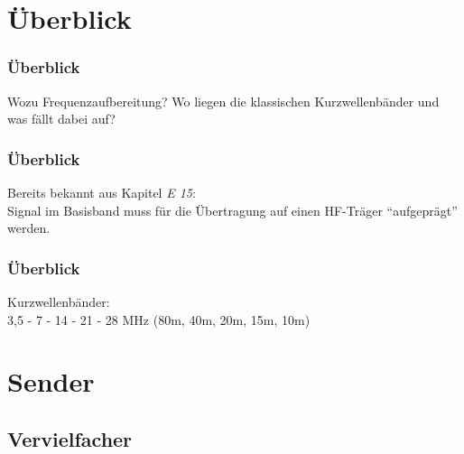 

\subtitle{Technik Klasse A 13: \\
          Frequenzaufbereitung \\[2em]}
\date{Stand 18.06.2015}




\section{Überblick}

\begin{frame}
    \frametitle{Überblick}

    Wozu Frequenzaufbereitung? Wo liegen die klassischen Kurzwellenbänder und
    was fällt dabei auf?

\end{frame}

\begin{frame}
    \frametitle{Überblick}

    Bereits bekannt aus Kapitel \emph{E 15}: \\[2em]

    Signal im Basisband muss für die Übertragung auf einen HF-Träger
    "`aufgeprägt"' werden.

\end{frame}

\begin{frame}
    \frametitle{Überblick}

    Kurzwellenbänder: \\[2em]

    3,5 - 7 - 14 - 21 - 28 MHz (80m, 40m, 20m, 15m, 10m)

\end{frame}

\section{Sender}

\subsection{Vervielfacher}

